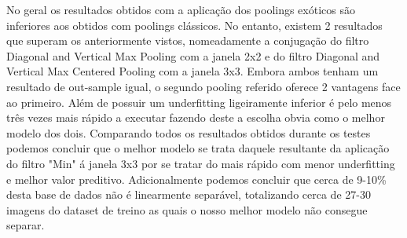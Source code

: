 \begin{table}[h]
\end{table}

\begin{table}[h]
	\centering
\end{table}


No geral os resultados obtidos com a aplicação dos poolings exóticos são inferiores aos obtidos com poolings clássicos. No entanto, existem 2 resultados que superam os anteriormente vistos, nomeadamente a conjugação do filtro Diagonal and Vertical Max Pooling com a janela 2x2 e do filtro Diagonal and Vertical Max Centered Pooling com a janela 3x3. Embora ambos tenham um resultado de out-sample igual, o segundo pooling referido oferece 2 vantagens face ao primeiro. Além de possuir um underfitting ligeiramente inferior é pelo menos três vezes mais rápido a executar fazendo deste a escolha obvia como o melhor modelo dos dois.\newline
\hfill\newline
Comparando todos os resultados obtidos durante os testes podemos concluir que o melhor modelo se trata daquele resultante da aplicação do filtro "Min" á janela 3x3 por se tratar do mais rápido com menor underfitting e melhor valor preditivo. Adicionalmente podemos concluir que cerca de 9-10\% desta base de dados não é linearmente separável, totalizando cerca de 27-30 imagens do dataset de treino as quais o nosso melhor modelo não consegue separar. 

